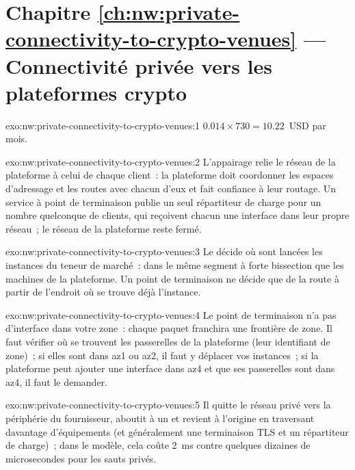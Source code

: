 \section*{Chapitre \ref{ch:nw:private-connectivity-to-crypto-venues} --- Connectivité privée vers les plateformes crypto}

\begin{solution}{exo:nw:private-connectivity-to-crypto-venues:1}
$0.014 \times 730 = 10.22$~USD par mois.
\end{solution}

\begin{solution}{exo:nw:private-connectivity-to-crypto-venues:2}
L'appairage relie le réseau de la plateforme à celui de chaque client~: la plateforme doit coordonner les espaces d'adressage et les routes avec chacun d'eux et fait confiance à leur
routage. Un service à point de terminaison publie un seul répartiteur de charge pour un nombre quelconque de clients, qui reçoivent chacun une interface dans leur propre réseau~; le
réseau de la plateforme reste fermé.
\end{solution}

\begin{solution}{exo:nw:private-connectivity-to-crypto-venues:3}
Le  décide où sont lancées les instances du teneur de marché~: dans le même segment à forte bissection que les machines de la plateforme. Un point de terminaison
ne décide que de la route à partir de l'endroit où se trouve déjà l'instance.
\end{solution}

\begin{solution}{exo:nw:private-connectivity-to-crypto-venues:4}
Le point de terminaison n'a pas d'interface dans votre zone~: chaque paquet franchira une frontière de zone. Il faut vérifier où se trouvent les passerelles de la plateforme (leur
identifiant de zone)~; si elles sont dans az1 ou az2, il faut y déplacer vos instances~; si la plateforme peut ajouter une interface dans az4 et que ses passerelles sont dans az4, il faut le demander.
\end{solution}

\begin{solution}{exo:nw:private-connectivity-to-crypto-venues:5}
Il quitte le réseau privé vers la périphérie du fournisseur, aboutit à un  et revient à l'origine en traversant davantage d'équipements
(et généralement une terminaison TLS et un répartiteur de charge)~; dans le modèle, cela coûte \qty{2}{\milli\second} contre quelques dizaines de microsecondes pour les
sauts privés.
\end{solution}

